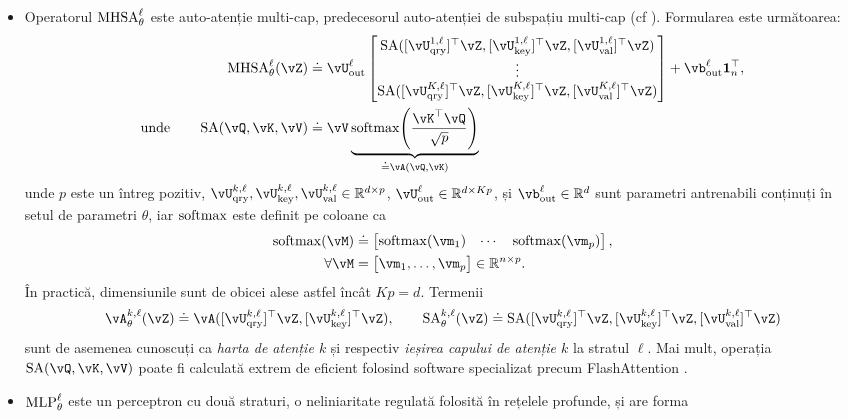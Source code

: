 \documentclass[../../book-main_ro.tex]{subfiles}
\begin{document}
\begin{itemize}
    \item Operatorul \(\operatorname{MHSA}_{\theta}^{\ell}\) este auto-atenție multi-cap, predecesorul auto-atenției de subspațiu multi-cap (cf ). Formularea este următoarea:
    \begin{align}
        \MHSA_{\theta}^{\ell}(\vZ) \label{eq:mhsa}
        &\doteq \vU_{\out}^{\ell}\mat{\SA([\vU_{\query}^{1, \ell}]^{\top}\vZ, [\vU_{\attnkey}^{1, \ell}]^{\top}\vZ, [\vU_{\val}^{1, \ell}]^{\top}\vZ) \\ \vdots \\ \SA([\vU_{\query}^{K, \ell}]^{\top}\vZ, [\vU_{\attnkey}^{K, \ell}]^{\top}\vZ, [\vU_{\val}^{K, \ell}]^{\top}\vZ)} + \vb_{\out}^{\ell}\vone_{n}^{\top}, \\
        \label{eq:self_attention}
        \text{unde} \qquad \SA(\vQ, \vK, \vV)
        &\doteq \vV \underbrace{\softmax\rp{\frac{\vK^{\top}\vQ}{\sqrt{p}}}}_{\doteq \vA(\vQ, \vK)}
    \end{align}
    unde \(p\) este un întreg pozitiv, \(\vU_{\query}^{k, \ell}, \vU_{\attnkey}^{k, \ell}, \vU_{\val}^{k, \ell} \in \R^{d \times p}\), \(\vU_{\out}^{\ell} \in \R^{d \times Kp}\), și \(\vb_{\out}^{\ell} \in \R^{d}\) sunt parametri antrenabili conținuți în setul de parametri \(\theta\), iar \(\operatorname{\mathrm{softmax}}\) este definit pe coloane ca 
    \begin{align}
        \softmax(\vM) 
        &\doteq \mat{\softmax(\vm_{1}) & \cdots & \softmax(\vm_{p})}, \\ 
        \forall \vM 
        &= \mat{\vm_{1}, \dots, \vm_{p}} \in \R^{n \times p}.
    \end{align}
    În practică, dimensiunile sunt de obicei alese astfel încât \(Kp = d\). Termenii 
    \begin{equation}
        \label{eq:attention_map}
        \vA_{\theta}^{k, \ell}(\vZ) \doteq \vA([\vU_{\query}^{k, \ell}]^{\top}\vZ, [\vU_{\attnkey}^{k, \ell}]^{\top}\vZ), \qquad \SA_{\theta}^{k, \ell}(\vZ) \doteq \SA([\vU_{\query}^{k, \ell}]^{\top}\vZ, [\vU_{\attnkey}^{k, \ell}]^{\top}\vZ, [\vU_{\val}^{k, \ell}]^{\top}\vZ)
    \end{equation}
    sunt de asemenea cunoscuți ca \textit{harta de atenție \(k\)} și respectiv \textit{ieșirea capului de atenție \(k\)} la stratul \(\ell\). Mai mult, operația \(\SA(\vQ, \vK, \vV)\) poate fi calculată extrem de eficient folosind software specializat precum FlashAttention \citep{shah2025flashattention}.
    \item \(\operatorname{MLP}_{\theta}^{\ell}\) este un perceptron cu două straturi, o neliniaritate regulată folosită în rețelele profunde, și are forma 

\end{itemize}
\end{document}
